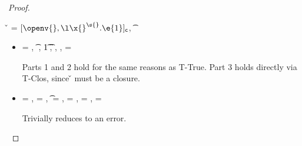 \begin{lemma}
\begin{proof}
\begin{case}[B-Abs]
\begin{itemize}
\begin{subcase}[T-Clos]
      \end{subcase} 
  \end{itemize}
\end{case}

\begin{case}[B-Abs]
        \v{} = ${\closure {\openv{}} {\abs {\x{}} {\s{}} {\e{1}}}}$,
          { \opsem {\openv{}}
                   {\abs {\x{}} {\t{}} {}}
                   {\closure {\openv{}} {\abs {\x{}} {\s{}} {}}}}

  \begin{itemize}
    \item[]
      \begin{subcase}[T-Abs]
  \ep{} = {\abs {\x{}} {\s{}} {}},
{ \judgementrewrite {\propenv{}, {\isprop {\s{}} {\x{}}}}
            {} {\t{}}
             {
                         {}}
             {}
             {}},
           \issubtypein{}
           {\ArrowOne {\x{}} {\s{}}
                      {\t{1}}
                      {
                                  {}}
                      {}}
          {\t{}},
          \inpropenv{\topprop{}}{\thenprop{\prop{}}},
          \inpropenv{\botprop{}}{\elseprop{\prop{}}},
          {\object{}} = {\emptyobject{}}

        Parts 1 and 2 hold for the same reasons as T-True.
        Part 3 holds directly via T-Clos, since \v{} must be a closure.
      \end{subcase}
  \end{itemize}
\end{case}

\begin{case}[BE-Error]
        \opsem {\openv{}} {\e{}} {}


  \begin{itemize}
    \item[]
      \begin{subcase}[T-Error] 
  \ep{} = ,
  \e{} = ,
  \t{} = \Bot,
  \thenprop{\prop{}} = \botprop{}, \elseprop{\prop{}} = \botprop{}, \object{} = \emptyobject{}

        Trivially reduces to an error.
      \end{subcase}
  \end{itemize}
\end{case}

\end{proof}

\end{lemma}

{}

{}
